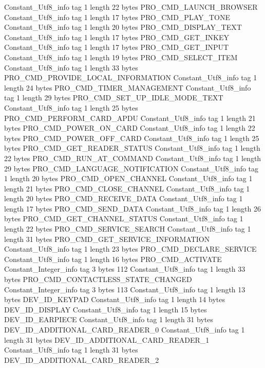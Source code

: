 {{{		}
		Constant_Utf8_info {
			tag	1
			length	22
			bytes	PRO_CMD_LAUNCH_BROWSER
		}
		Constant_Utf8_info {
			tag	1
			length	17
			bytes	PRO_CMD_PLAY_TONE
		}
		Constant_Utf8_info {
			tag	1
			length	20
			bytes	PRO_CMD_DISPLAY_TEXT
		}
		Constant_Utf8_info {
			tag	1
			length	17
			bytes	PRO_CMD_GET_INKEY
		}
		Constant_Utf8_info {
			tag	1
			length	17
			bytes	PRO_CMD_GET_INPUT
		}
		Constant_Utf8_info {
			tag	1
			length	19
			bytes	PRO_CMD_SELECT_ITEM
		}
		Constant_Utf8_info {
			tag	1
			length	33
			bytes	PRO_CMD_PROVIDE_LOCAL_INFORMATION
		}
		Constant_Utf8_info {
			tag	1
			length	24
			bytes	PRO_CMD_TIMER_MANAGEMENT
		}
		Constant_Utf8_info {
			tag	1
			length	29
			bytes	PRO_CMD_SET_UP_IDLE_MODE_TEXT
		}
		Constant_Utf8_info {
			tag	1
			length	25
			bytes	PRO_CMD_PERFORM_CARD_APDU
		}
		Constant_Utf8_info {
			tag	1
			length	21
			bytes	PRO_CMD_POWER_ON_CARD
		}
		Constant_Utf8_info {
			tag	1
			length	22
			bytes	PRO_CMD_POWER_OFF_CARD
		}
		Constant_Utf8_info {
			tag	1
			length	25
			bytes	PRO_CMD_GET_READER_STATUS
		}
		Constant_Utf8_info {
			tag	1
			length	22
			bytes	PRO_CMD_RUN_AT_COMMAND
		}
		Constant_Utf8_info {
			tag	1
			length	29
			bytes	PRO_CMD_LANGUAGE_NOTIFICATION
		}
		Constant_Utf8_info {
			tag	1
			length	20
			bytes	PRO_CMD_OPEN_CHANNEL
		}
		Constant_Utf8_info {
			tag	1
			length	21
			bytes	PRO_CMD_CLOSE_CHANNEL
		}
		Constant_Utf8_info {
			tag	1
			length	20
			bytes	PRO_CMD_RECEIVE_DATA
		}
		Constant_Utf8_info {
			tag	1
			length	17
			bytes	PRO_CMD_SEND_DATA
		}
		Constant_Utf8_info {
			tag	1
			length	26
			bytes	PRO_CMD_GET_CHANNEL_STATUS
		}
		Constant_Utf8_info {
			tag	1
			length	22
			bytes	PRO_CMD_SERVICE_SEARCH
		}
		Constant_Utf8_info {
			tag	1
			length	31
			bytes	PRO_CMD_GET_SERVICE_INFORMATION
		}
		Constant_Utf8_info {
			tag	1
			length	23
			bytes	PRO_CMD_DECLARE_SERVICE
		}
		Constant_Utf8_info {
			tag	1
			length	16
			bytes	PRO_CMD_ACTIVATE
		}
		Constant_Integer_info {
			tag	3
			bytes	112
		}
		Constant_Utf8_info {
			tag	1
			length	33
			bytes	PRO_CMD_CONTACTLESS_STATE_CHANGED
		}
		Constant_Integer_info {
			tag	3
			bytes	113
		}
		Constant_Utf8_info {
			tag	1
			length	13
			bytes	DEV_ID_KEYPAD
		}
		Constant_Utf8_info {
			tag	1
			length	14
			bytes	DEV_ID_DISPLAY
		}
		Constant_Utf8_info {
			tag	1
			length	15
			bytes	DEV_ID_EARPIECE
		}
		Constant_Utf8_info {
			tag	1
			length	31
			bytes	DEV_ID_ADDITIONAL_CARD_READER_0
		}
		Constant_Utf8_info {
			tag	1
			length	31
			bytes	DEV_ID_ADDITIONAL_CARD_READER_1
		}
		Constant_Utf8_info {
			tag	1
			length	31
			bytes	DEV_ID_ADDITIONAL_CARD_READER_2
}}}
